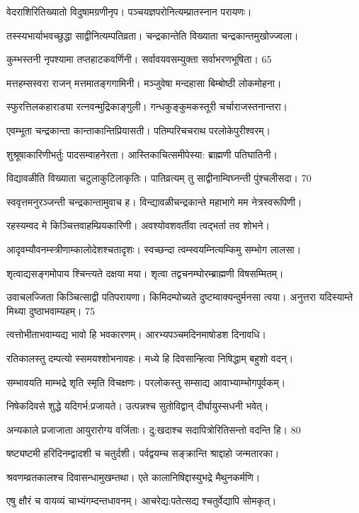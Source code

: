 वेदराशिरितिख्यातो विदुषामग्रणीनृप।
पञ्चयज्ञपरोनित्यम्प्रातस्नान परायणः।

तस्स्यभार्याभवच्छुद्धा साद्वीनित्यम्पतिव्रता।
चन्द्रकान्तेति विख्याता चन्द्रकान्तमुखोज्ज्वला।

कुम्भस्तनी नृपश्यामा तप्तहाटकवर्णिनी।
सर्वावयवसम्युक्ता सर्वाभरणभूषिता। 65

मत्तहम्सस्वरा राजन् मत्तमातङ्गगामिनी।
मञ्जुवेषा मन्दहासा बिम्बोष्ठी लोकमोहना।

स्फुरत्तिलकहाराड्या रत्नवन्मुद्रिकाङ्गुली।
गन्धकुङ्कुमकस्तूरी चर्चाराजस्तनान्तरा।

एवम्भूता चन्द्रकान्ता कान्ताकान्तिप्रियासती।
पतिम्परिचचराथ परलोकेपुरीश्वरम्।

शुश्रूषाकारिणीभर्तुः पादसम्वाहनेरता।
आस्तिकाचित्समीपेस्या: ब्राह्मणी पतिघातिनी।

विद्यावळीति विख्याता चटुलाकुटिलाकृतिः।
पातिव्रत्यम् तु साद्वीनाम्विघ्नन्ती पुंश्चलीसदा। 70

स्ववृत्तमनुरञ्जन्ती चन्द्रकान्तामुवाच ह।
विन्द्यावळीचन्द्रकान्ते महाभागे मम नेत्रस्वरूपिणी।

रहस्यम्वद मे किञ्चित्तवाहम्प्रियकारिणी।
अवश्योवशवर्तीवा त्वद्भर्ता तव शोभने।

आदृवम्यौवनम्स्त्रीणाम्कालोदेशश्चतादृशः।
स्वच्छन्दा त्वम्स्वयम्नित्यम्किमु सम्भोग लालसा।

शृत्वाद्यसङ्गमोपाय श्चिन्त्यते दक्षया मया।
शृत्वा तद्वचनम्घोरम्ब्राह्मणी विषसम्मितम्।

उवाचलज्जिता किञ्चित्साद्वी पतिपरायणा।
किमिदम्पोच्यते दुष्टम्वाक्यन्दुर्मनसा त्वया।
अनुत्तरा यदिस्याम्ते मिथ्या दुष्ठाभवाम्यहम्। 75

त्वत्तोभीताभवाम्यद्य भावो हि भवकारणम्।
आरभ्यपञ्चमदिनमाषोडश दिनावधि।

रतिकालस्तु दम्पत्यो स्समयश्शोभनावहः।
मध्ये हि दिवसान्हित्वा निषिद्धाम् बहुशो वदन्।

सम्भावयति माम्भद्रे शृति स्मृति विचक्षणः।
परलोकस्तु सम्साद्य आवाभ्याम्भोगपूर्वकम्।

निषेकदिवसे शुद्धे यदिगर्भ:प्रजायते।
उत्पन्नश्च सुतोविद्वान् दीर्घायुस्सधनी भवेत्।

अन्यकाले प्रजाजाता आयुरारोग्य वर्जिताः।
दु:खदाश्च सदापित्रोरितिसन्तो वदन्ति हि। 80

षष्ट्यष्टमी हरिदिनम्द्वादशी च चतुर्दशी।
पर्वद्वयम्च सङ्क्रान्ति श्राद्दाहो जन्मतारका।

श्रवणम्व्रतकालश्च दिवासन्धामुखम्तथा।
एते कालानिषिद्दास्युभद्रे मैथुनकर्मणि।

एषु क्षौरं च वायव्यं चाभ्यंगम्दन्तधावनम्।
आचरेद्य:पतेत्सद्य श्चतुर्वेद्यापि सोमकृत्।

